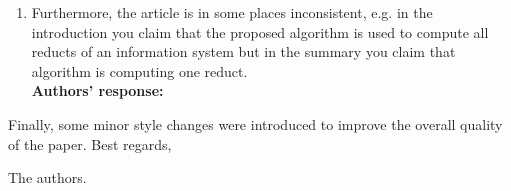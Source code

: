 \documentclass{letter}
\begin{document}
\begin{letter}{}
\begin{enumerate}
	  \item Furthermore, the article is in some places inconsistent, e.g. in the introduction you  claim that the proposed algorithm is used to compute all reducts of an information system but in the summary you claim that algorithm is computing one reduct. \\
	  \textbf{Authors’ response:} 
  \end{enumerate}  
     
  
  
  
  Finally, some minor style changes were introduced to improve the overall quality of the paper.
  Best regards,
    
  \begin{flushright}
    The authors.
  \end{flushright}
\end{letter}
\end{document}
